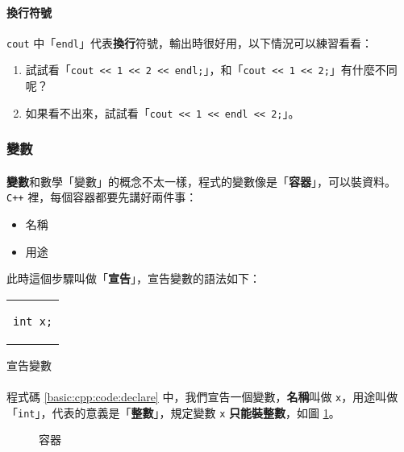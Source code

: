 \documentclass[12pt,a4paper,oneside]{article}
\begin{document}
\begin{CJK}{UTF8}{bkai}
\paragraph{換行符號}\lstinline!cout! 中「\lstinline!endl!」代表\textbf{換行}符號，輸出時很好用，以下情況可以練習看看：
\begin{enumerate}
\item 試試看「\lstinline!cout << 1 << 2 << endl;!」，和「\lstinline!cout << 1 << 2;!」有什麼不同呢？
\item 如果看不出來，試試看「\lstinline!cout << 1 << endl << 2;!」。
\end{enumerate}

\subsubsection{變數}

\paragraph{}\textbf{變數}和數學「變數」的概念不太一樣，程式的變數像是「\textbf{容器}」，可以裝資料。\texttt{C++} 裡，每個容器都要先講好兩件事：
\begin{itemize}
\item 名稱
\item 用途
\end{itemize}
此時這個步驟叫做「\textbf{宣告}」，宣告變數的語法如下：

\begin{code}[h!]
\centering
\begin{tabular}{c}
\begin{lstlisting}
int x;
\end{lstlisting}
\end{tabular}
\caption{宣告變數}
\label{basic:cpp:code:declare}
\end{code}

\paragraph{}程式碼 \ref{basic:cpp:code:declare} 中，我們宣告一個變數，\textbf{名稱}叫做 \lstinline!x!，用途叫做「\lstinline!int!」，代表的意義是「\textbf{整數}」，規定變數 \lstinline!x! \textbf{只能裝整數}，如圖 \ref{basic:cpp:fig:variable}。

\begin{figure}[h]
\centering
{}
\caption{容器}
\label{basic:cpp:fig:variable}
\end{figure}


\end{CJK}
\end{document}
